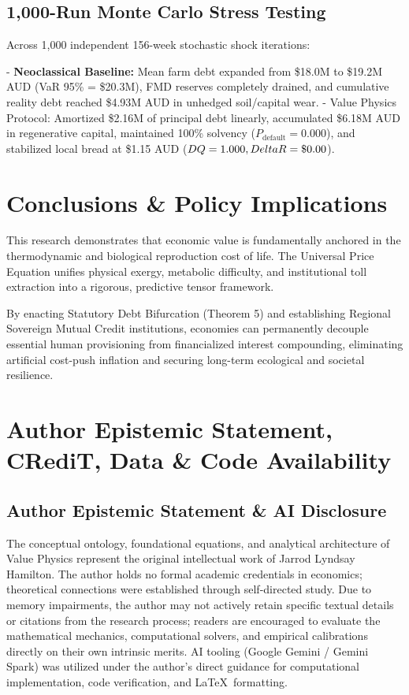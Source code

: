 \documentclass[preprint,12pt,authoryear]{elsarticle}
\theoremstyle{definition}
\begin{document}
\subsection{1,000-Run Monte Carlo Stress Testing}

Across 1,000 independent 156-week stochastic shock iterations:

  

  - \textbf{Neoclassical Baseline:} Mean farm debt expanded from \$18.0M to \$19.2M AUD (VaR 95\% = \$20.3M), FMD reserves completely drained, and cumulative reality debt reached \$4.93M AUD in unhedged soil/capital wear.
  - Value Physics Protocol: Amortized \$2.16M of principal debt linearly, accumulated \$6.18M AUD in regenerative capital, maintained 100\% solvency ($P_{\text{default}} = 0.000$), and stabilized local bread at \$1.15 AUD ($DQ = 1.000, \\Delta R = \$0.00$).

\section{Conclusions \& Policy Implications}

This research demonstrates that economic value is fundamentally anchored in the thermodynamic and biological reproduction cost of life. The Universal Price Equation unifies physical exergy, metabolic difficulty, and institutional toll extraction into a rigorous, predictive tensor framework.

  

By enacting Statutory Debt Bifurcation (Theorem 5) and establishing Regional Sovereign Mutual Credit institutions, economies can permanently decouple essential human provisioning from financialized interest compounding, eliminating artificial cost-push inflation and securing long-term ecological and societal resilience.

\section{Author Epistemic Statement, CRediT, Data \& Code Availability}

\subsection*{Author Epistemic Statement \& AI Disclosure}
The conceptual ontology, foundational equations, and analytical architecture of Value Physics represent the original intellectual work of Jarrod Lyndsay Hamilton. The author holds no formal academic credentials in economics; theoretical connections were established through self-directed study. Due to memory impairments, the author may not actively retain specific textual details or citations from the research process; readers are encouraged to evaluate the mathematical mechanics, computational solvers, and empirical calibrations directly on their own intrinsic merits. AI tooling (Google Gemini / Gemini Spark) was utilized under the author's direct guidance for computational implementation, code verification, and \LaTeX\ formatting.
\end{document}
